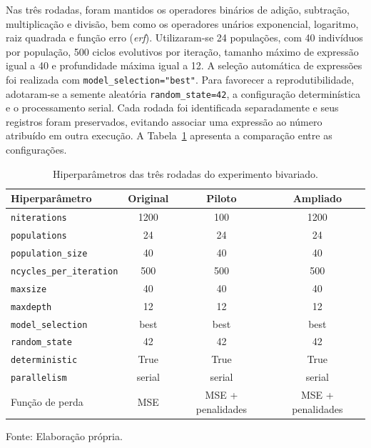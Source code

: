 Nas três rodadas, foram mantidos os operadores binários de adição, subtração, multiplicação e divisão, bem como os operadores unários exponencial, logaritmo, raiz quadrada e função erro (\textit{erf}). Utilizaram-se 24 populações, com 40 indivíduos por população, 500 ciclos evolutivos por iteração, tamanho máximo de expressão igual a 40 e profundidade máxima igual a 12. A seleção automática de expressões foi realizada com \texttt{model\_selection="best"}. Para favorecer a reprodutibilidade, adotaram-se a semente aleatória \texttt{random\_state=42}, a configuração determinística e o processamento serial. Cada rodada foi identificada separadamente e seus registros foram preservados, evitando associar uma expressão ao número atribuído em outra execução. A Tabela~\ref{tab:configuracoes_pysr_bivariada} apresenta a comparação entre as configurações.

\begin{table}[htbp]
    \centering
    \caption{Hiperparâmetros das três rodadas do experimento bivariado.}
    \label{tab:configuracoes_pysr_bivariada}
    \small
    \begin{tabular}{lccc}
        \hline
        \textbf{Hiperparâmetro} & \textbf{Original} & \textbf{Piloto} & \textbf{Ampliado} \\
        \hline
        \texttt{niterations} & 1200 & 100 & 1200 \\
        \texttt{populations} & 24 & 24 & 24 \\
        \texttt{population\_size} & 40 & 40 & 40 \\
        \texttt{ncycles\_per\_iteration} & 500 & 500 & 500 \\
        \texttt{maxsize} & 40 & 40 & 40 \\
        \texttt{maxdepth} & 12 & 12 & 12 \\
        \texttt{model\_selection} & best & best & best \\
        \texttt{random\_state} & 42 & 42 & 42 \\
        \texttt{deterministic} & True & True & True \\
        \texttt{parallelism} & serial & serial & serial \\
        Função de perda & MSE & MSE + penalidades & MSE + penalidades \\
        \hline
    \end{tabular}
    \vspace{0.2cm}
    {\footnotesize Fonte: Elaboração própria.\par}
\end{table}


